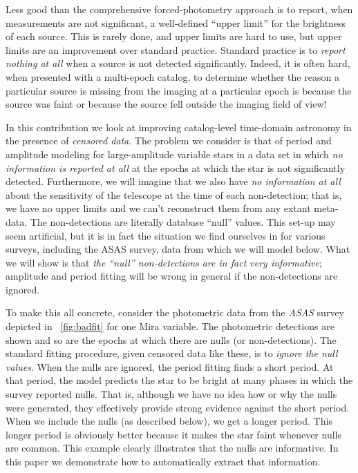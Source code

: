 \documentclass[12pt,preprint]{aastex}
\begin{document}
Less good than the comprehensive forced-photometry approach is to report, when measurements are not significant,
a well-defined ``upper limit'' for the brightness of each source.
This is rarely done, and upper limits are hard to use, but upper limits are an improvement over standard practice.
Standard practice is to \emph{report nothing at all} when a source is not detected significantly.
Indeed, it is often hard, when presented with a multi-epoch catalog,
to determine whether the reason a particular source is missing from the imaging at a particular epoch
is because the source was faint or because the source fell outside the imaging field of view!

In this contribution we look at improving catalog-level time-domain astronomy in the presence of \emph{censored data}.
The problem we consider is that of period and amplitude modeling for large-amplitude variable stars in a data set
in which \emph{no information is reported at all} at the epochs at which the star is not significantly detected.
Furthermore, we will imagine that we also have \emph{no information at all} about the sensitivity of the telescope
at the time of each non-detection; that is, we have no upper limits and we can't reconstruct them from any extant meta-data.
The non-detections are literally database ``null'' values.
This set-up may seem artificial, but it is in fact the situation we find ourselves in for various surveys,
including the ASAS survey, data from which we will model below.
What we will show is that \emph{the ``null'' non-detections are in fact very informative};
amplitude and period fitting will be wrong in general if the non-detections are ignored.

To make this all concrete, consider the photometric data from the \textsl{ASAS} survey
depicted in \figurename~\ref{fig:badfit} for one Mira variable.
The photometric detections are shown and so are the epochs at which there are nulls (or non-detections).
The standard fitting procedure, given censored data like these, is to \emph{ignore the null values}.
When the nulls are ignored, the period fitting finds a short period.
At that period, the model predicts the star to be bright at many phases in which the survey reported nulls.
That is, although we have no idea how or why the nulls were generated,
they effectively provide strong evidence against the short period.
When we include the nulls (as described below), we get a longer period.
This longer period is obviously better because it makes the star faint whenever nulls are common.
This example clearly illustrates that the nulls are informative.
In this paper we demonstrate how to automatically extract that information.
\end{document}
